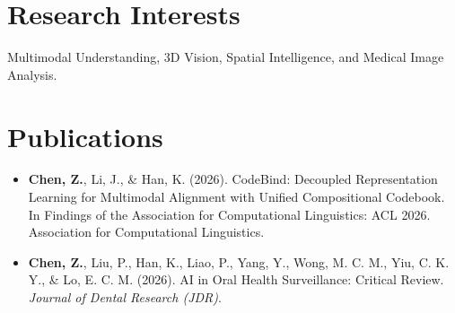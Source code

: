 \documentclass[letterpaper,10pt]{article}
\makeatletter
\newcommand{\resumeItem}[1]{
  \item\small{
    {#1 \vspace{-2pt}}
  }
}
\newcommand{\resumeSubheading}[5]{
  \vspace{2pt}\item
    \begin{tabular*}{0.97\textwidth}[t]{l@{\extracolsep{\fill}}r}
      \textbf{#1} & #2 \\
      \textit{\small#3} & \textit{\small #4}
      \if\relax\detokenize{#5}\relax\else \\
        \multicolumn{2}{l}{\small\textit{#5}}
      \fi
    \end{tabular*}\vspace{-1pt}
}
\newcommand{\resumeSubHeadingListEnd}{\end{itemize}}
\newcommand{\resumeItemListStart}{\begin{itemize}}
\newcommand{\resumeItemListEnd}{\end{itemize}\vspace{-0pt}}
\makeatother
\begin{document}




\section{Research Interests}
  \small{Multimodal Understanding, 3D Vision, Spatial Intelligence, and Medical Image Analysis.}


\section{Publications}
 \begin{itemize}[leftmargin=0.15in, label={}]
    \item{
    \textbf{Chen, Z.}, Li, J., \& Han, K. (2026). CodeBind: Decoupled Representation Learning for Multimodal Alignment with Unified Compositional Codebook. In Findings of the Association for Computational Linguistics: ACL 2026. Association for Computational Linguistics.
    }
    \item{
    \textbf{Chen, Z.}, Liu, P., Han, K., Liao, P., Yang, Y., Wong, M. C. M., Yiu, C. K. Y., \& Lo, E. C. M. (2026). AI in Oral Health Surveillance: Critical Review. \textit{Journal of Dental Research (JDR)}.
    }
 \end{itemize}
\end{document}
